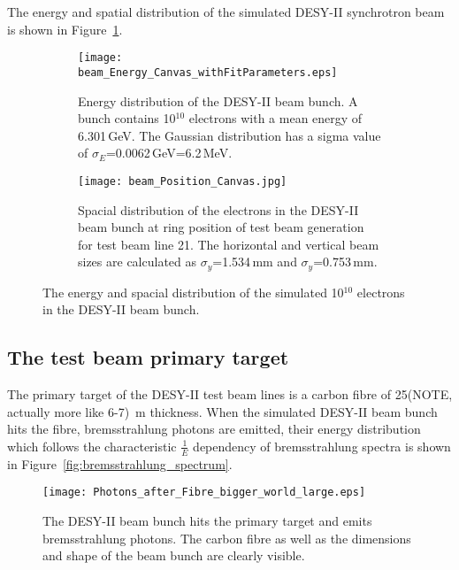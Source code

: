 The energy and spatial distribution of the simulated DESY-II synchrotron beam is shown in Figure~\ref{fig:DESY-II_beam_bunch_energy_spacial_deflection}.

\begin{figure}
  \centering
  \begin{subfigure}[t]{0.47\textwidth}
    \texttt{[image: beam\_Energy\_Canvas\_withFitParameters.eps]}
      \caption[Energy distribution of DESY-II beam bunch.]{Energy distribution of the DESY-II beam bunch. A bunch contains 10$^{10}$ electrons with a mean energy of 6.301\,GeV. The Gaussian distribution has a sigma value of $\sigma_E$=0.0062\,GeV=6.2\,MeV.}
  \end{subfigure}
\hfill
  \begin{subfigure}[t]{0.47\textwidth}
    \texttt{[image: beam\_Position\_Canvas.jpg]}
      \caption[Spacial distribution of electrons in DESY-II beam bunch.]{Spacial distribution of the electrons in the DESY-II beam bunch at ring position of test beam generation for test beam line 21. The horizontal and vertical beam sizes are calculated as $\sigma_y$=1.534\,mm and $\sigma_y$=0.753\,mm.}
  \end{subfigure}
 \caption[Simulated DESY-II beam bunch: energy and spacial distribution of electrons.]{The energy and spacial distribution of the simulated 10$^{10}$ electrons in the DESY-II beam bunch.}
  \label{fig:DESY-II_beam_bunch_energy_spacial_deflection}
\end{figure}

\subsection{The test beam primary target}

The primary target of the DESY-II test beam lines is a carbon fibre of 25(NOTE, 
actually more like 6-7) \,\textmu m thickness. When the simulated DESY-II beam 
bunch hits the fibre, bremsstrahlung photons are emitted, their energy 
distribution which follows the characteristic $\frac{1}{E}$ dependency 
of bremsstrahlung spectra is shown in Figure~\ref{fig:bremsstrahlung_spectrum}.

\begin{figure}[htbp]
  \centering
    \texttt{[image: Photons\_after\_Fibre\_bigger\_world\_large.eps]}
  \caption[Simulated bremsstrahlung photons emitted from the primary target.]{The DESY-II beam bunch hits the primary target and emits bremsstrahlung photons. The carbon fibre as well as the dimensions and shape of the beam bunch are clearly visible.}
  \label{fig:bremsstrahlung_scatter}
\end{figure}

